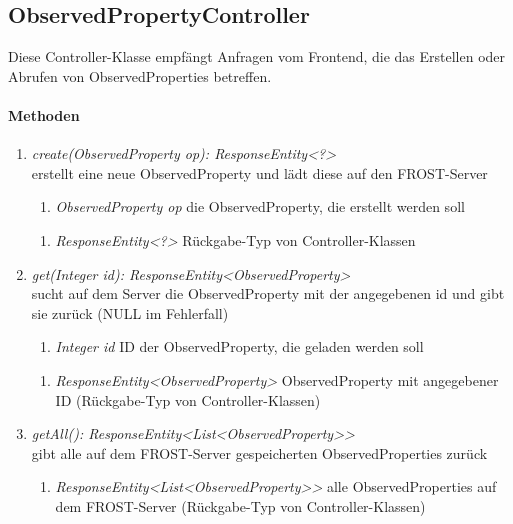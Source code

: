 \subsection*{ObservedPropertyController}\label{ObsPCon}
Diese Controller-Klasse empfängt Anfragen vom Frontend, die das Erstellen oder Abrufen von ObservedProperties betreffen.

\paragraph{Methoden}

\begin{enumerate}[+]
	\item \textit{ create(ObservedProperty op): ResponseEntity<?> }\\
	erstellt eine neue ObservedProperty und lädt diese auf den FROST-Server
	
	\begin{enumerate}[$\bullet$]
		\item \textit{ObservedProperty op} die ObservedProperty, die erstellt werden soll
		
	\end{enumerate}
	\vspace{-0.2cm}
	\begin{enumerate}[$\circ$]
		\item \textit{ResponseEntity<?>} Rückgabe-Typ von Controller-Klassen
	\end{enumerate}
	
	\item \textit{ get(Integer id): ResponseEntity<ObservedProperty> }\\
	sucht auf dem Server die ObservedProperty mit der angegebenen id und gibt sie zurück (NULL im Fehlerfall)
	
	\begin{enumerate}[$\bullet$]
		\item \textit{Integer id} ID der ObservedProperty, die geladen werden soll
		
	\end{enumerate}
	\vspace{-0.2cm}
	\begin{enumerate}[$\circ$]
		\item \textit{ResponseEntity<ObservedProperty>} ObservedProperty mit angegebener ID (Rückgabe-Typ von Controller-Klassen)
	\end{enumerate}
	\item \textit{ getAll(): ResponseEntity<List<ObservedProperty>> }\\
	gibt alle auf dem FROST-Server gespeicherten ObservedProperties zurück
	
	\begin{enumerate}[$\circ$]
		\item \textit{ResponseEntity<List<ObservedProperty>>} alle ObservedProperties auf dem FROST-Server (Rückgabe-Typ von Controller-Klassen)
	\end{enumerate}
	
	
\end{enumerate}	